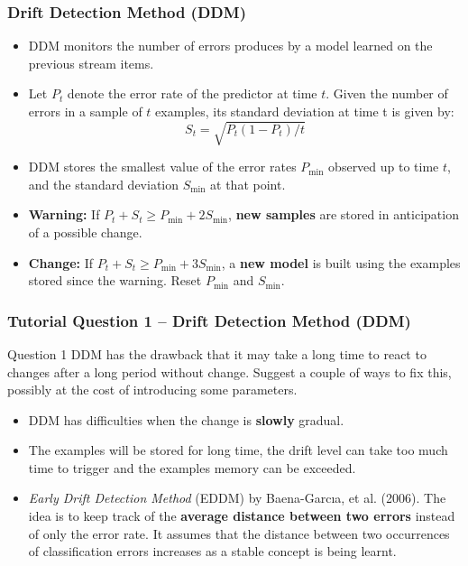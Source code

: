 \documentclass[aspectratio=169, 10pt]{beamer}
\begin{document}
\begin{frame}
    \frametitle{Drift Detection Method (DDM)}
    
    \begin{itemize}
        \item DDM monitors the number of errors produces by a model learned on the previous stream items.
        \item Let $P_t$ denote the error rate of the predictor at time $t$. 
        Given the number of errors in a sample of $t$ examples, its standard deviation at time t is given by:
        \[
            S_t = \sqrt{P_t(1-P_t)/t}
        \]
        \item DDM stores the smallest value of the error rates $P_{\text{min}}$ observed up to time $t$, and the standard deviation $S_{\text{min}}$ at that point.
        \item \textbf{Warning:} If $P_t + S_t \geq P_{\text{min}} + 2 S_{\text{min}}$, \textbf{new samples} are stored in anticipation of a possible change.
        \item \textbf{Change:} If $P_t + S_t  \geq P_{\text{min}} + 3 S_{\text{min}}$, a \textbf{new model} is built using the examples stored since the warning. Reset $P_{\text{min}}$ and $S_{\text{min}}$.
    \end{itemize}
\end{frame}

\begin{frame}[t]
    \frametitle{Tutorial Question 1 -- Drift Detection Method (DDM)}

    \begin{block}{Question 1}
        DDM has the drawback that it may take a long time to react to changes after a long period without change.
        Suggest a couple of ways to fix this, possibly at the cost of introducing some parameters.
    \end{block}
    
    \begin{itemize}
        \item DDM has difficulties when the change is \textbf{slowly} gradual. 
        \item  The examples will be stored for long time, the drift level can take too much time to trigger and the examples memory can be exceeded.
        \item {\em Early Drift Detection Method} (EDDM) by Baena-Garcıa, et al. (2006). The idea is to keep track of the \textbf{average distance between two errors} instead of only the error rate.
        It assumes that the distance between two occurrences of classification errors increases as a stable concept is being learnt.
    \end{itemize}
\end{frame}
\end{document}
